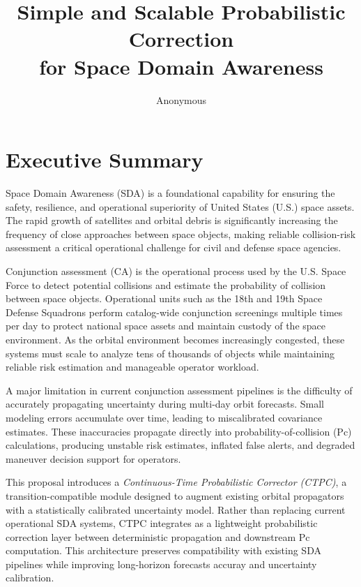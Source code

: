 \documentclass[10pt]{article}
\title{\textbf{Simple and Scalable Probabilistic Correction\\
for Space Domain Awareness}}
\author{Anonymous}
\date{}
\begin{document}
\maketitle

\section*{Executive Summary}

Space Domain Awareness (SDA) is a foundational capability for ensuring the safety, resilience, and operational superiority of United States (U.S.) space assets. The rapid growth of satellites and orbital debris is significantly increasing the frequency of close approaches between space objects, making reliable collision-risk assessment a critical operational challenge for civil and defense space agencies.

Conjunction assessment (CA) is the operational process used by the U.S. Space Force to detect potential collisions and estimate the probability of collision between space objects. Operational units such as the 18th and 19th Space Defense Squadrons perform catalog-wide conjunction screenings multiple times per day to protect national space assets and maintain custody of the space environment. As the orbital environment becomes increasingly congested, these systems must scale to analyze tens of thousands of objects while maintaining reliable risk estimation and manageable operator workload.

A major limitation in current conjunction assessment pipelines is the difficulty of accurately propagating uncertainty during multi-day orbit forecasts. Small modeling errors accumulate over time, leading to miscalibrated covariance estimates. These inaccuracies propagate directly into probability-of-collision (Pc) calculations, producing unstable risk estimates, inflated false alerts, and degraded maneuver decision support for operators.

This proposal introduces a \textit{Continuous-Time Probabilistic Corrector (CTPC)}, a transition-compatible module designed to augment existing orbital propagators with a statistically calibrated uncertainty model. Rather than replacing current operational SDA systems, CTPC integrates as a lightweight probabilistic correction layer between deterministic propagation and downstream Pc computation. This architecture preserves compatibility with existing SDA pipelines while improving long-horizon forecasts accuray and uncertainty calibration.
\end{document}
